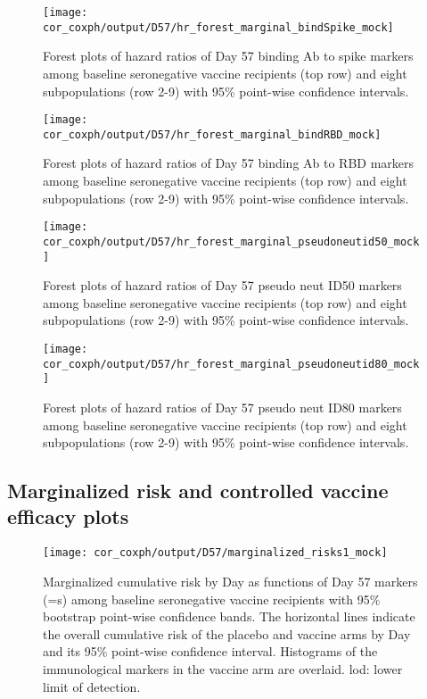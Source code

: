 \documentclass[
]{article}
\begin{document}
\clearpage

\begin{figure}[H]
    \centering
    \texttt{[image: cor\_coxph/output/D57/hr\_forest\_marginal\_bindSpike\_mock]}
    \caption{Forest plots of hazard ratios of Day 57 binding Ab to spike markers among baseline seronegative vaccine recipients (top row) and eight subpopulations (row 2-9) with 95\% point-wise confidence intervals.}
\end{figure}

\begin{figure}[H]
    \centering
    \texttt{[image: cor\_coxph/output/D57/hr\_forest\_marginal\_bindRBD\_mock]}
    \caption{Forest plots of hazard ratios of Day 57 binding Ab to RBD markers among baseline seronegative vaccine recipients (top row) and eight subpopulations (row 2-9) with 95\% point-wise confidence intervals.}
\end{figure}

\begin{figure}[H]
    \centering
    \texttt{[image: cor\_coxph/output/D57/hr\_forest\_marginal\_pseudoneutid50\_mock]}
    \caption{Forest plots of hazard ratios of Day 57 pseudo neut ID50 markers among baseline seronegative vaccine recipients (top row) and eight subpopulations (row 2-9) with 95\% point-wise confidence intervals.}
\end{figure}

\begin{figure}[H]
    \centering
    \texttt{[image: cor\_coxph/output/D57/hr\_forest\_marginal\_pseudoneutid80\_mock]}
    \caption{Forest plots of hazard ratios of Day 57 pseudo neut ID80 markers among baseline seronegative vaccine recipients (top row) and eight subpopulations (row 2-9) with 95\% point-wise confidence intervals.}
\end{figure}

\clearpage

\hypertarget{marginalized-risk-and-controlled-vaccine-efficacy-plots}{%
\subsection{Marginalized risk and controlled vaccine efficacy plots}\label{marginalized-risk-and-controlled-vaccine-efficacy-plots}}

\begin{figure}[H]
    \centering
    \texttt{[image: cor\_coxph/output/D57/marginalized\_risks1\_mock]}
    \caption{Marginalized cumulative risk by Day \protect as functions of Day 57 markers (=s) among baseline seronegative vaccine recipients with 95\% bootstrap point-wise confidence bands. The horizontal lines indicate the overall cumulative risk of the placebo and vaccine arms by Day \protect and its 95\% point-wise confidence interval. Histograms of the immunological markers in the vaccine arm are overlaid. lod: lower limit of detection.}
\end{figure}
\end{document}
